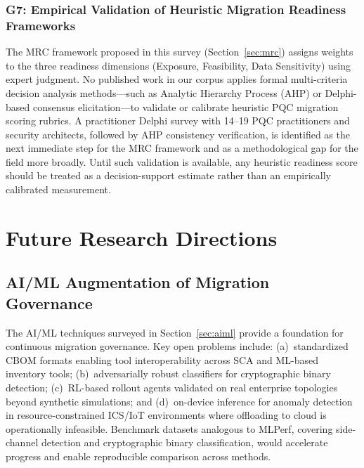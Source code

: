 \documentclass[journal]{IEEEtran}
\begin{document}
\subsubsection{G7: Empirical Validation of Heuristic Migration Readiness Frameworks}

The MRC framework proposed in this survey (Section~\ref{sec:mrc}) assigns
weights to the three readiness dimensions (Exposure, Feasibility, Data
Sensitivity) using expert judgment. No published work in our corpus applies
formal multi-criteria decision analysis methods---such as Analytic Hierarchy
Process (AHP) or Delphi-based consensus elicitation---to validate or calibrate
heuristic PQC migration scoring rubrics. A practitioner Delphi survey with
14--19 PQC practitioners and security architects, followed by AHP consistency
verification, is identified as the next immediate step for the MRC framework
and as a methodological gap for the field more broadly. Until such validation
is available, any heuristic readiness score should be treated as a decision-support
estimate rather than an empirically calibrated measurement.

\FloatBarrier
\section{Future Research Directions}
\label{sec:future}

\subsection{AI/ML Augmentation of Migration Governance}

The AI/ML techniques surveyed in Section~\ref{sec:aiml} provide a
foundation for continuous migration governance. Key open problems include:
(a)~standardized CBOM formats enabling tool interoperability across SCA
and ML-based inventory tools; (b)~adversarially robust classifiers for
cryptographic binary detection; (c)~RL-based rollout agents validated on
real enterprise topologies beyond synthetic simulations; and (d)~on-device
inference for anomaly detection in resource-constrained ICS/IoT environments
where offloading to cloud is operationally infeasible. Benchmark datasets
analogous to MLPerf, covering side-channel detection and cryptographic
binary classification, would accelerate progress and enable reproducible
comparison across methods.
\end{document}
